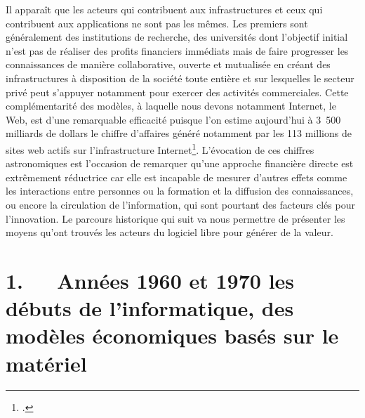\documentclass{FramateX}
\begin{document}
\begin{refsection}
Il apparaît que les acteurs qui contribuent aux infrastructures et ceux
qui contribuent aux applications ne sont pas les mêmes. Les premiers
sont généralement des institutions de recherche, des universités dont
l'objectif initial n'est pas de réaliser des profits financiers
immédiats mais de faire progresser les connaissances de manière
collaborative, ouverte et mutualisée en créant des infrastructures à
disposition de la société toute entière et sur lesquelles le secteur
privé peut s'appuyer notamment pour exercer des activités commerciales.
Cette complémentarité des modèles, à laquelle nous devons notamment
Internet, le Web, est d'une remarquable efficacité puisque l'on estime
aujourd'hui à 3~500 %
milliards de dollars le chiffre d'affaires généré
notamment par les 113 millions de sites web actifs sur l'infrastructure
Internet\footnote{\cite{mogleninnovation2012}.}.%
 L'évocation de ces chiffres astronomiques est
l'occasion de remarquer qu'une approche financière directe est
extrêmement réductrice car elle est incapable de mesurer d'autres
effets comme les interactions entre personnes ou la formation et la
diffusion des connaissances, ou encore la circulation de l'information,
qui sont pourtant des facteurs clés pour l'innovation. Le parcours
historique qui suit va nous permettre de présenter les moyens qu'ont
trouvés les acteurs du logiciel libre pour générer de la valeur.






\section*{1.~~~Années 1960 et 1970 les débuts de l'informatique, des modèles économiques basés sur le matériel}
{}


\end{refsection}
\end{document}
